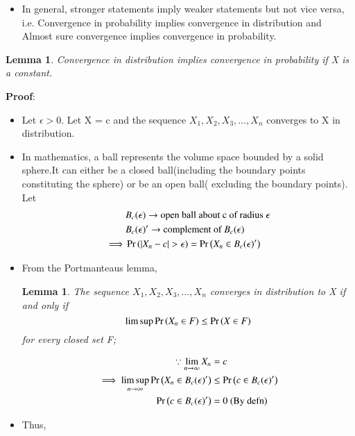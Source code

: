 \documentclass[journal,12pt,twocolumn]{IEEEtran}
\newtheorem{lemma}[theorem]{Lemma}
\begin{document}
\begin{itemize}
    \item In general, stronger statements imply weaker statements but not vice versa, i.e. Convergence in probability implies convergence in distribution and Almost sure convergence implies convergence in probability.
\end{itemize}
\begin{lemma} Convergence in distribution implies convergence in probability if X is a constant.\end{lemma}
    \textbf{Proof}:
    \begin{itemize}
        \item Let $\epsilon > 0$. Let X = c and the sequence $X_1,X_2,X_3, \dots ,X_n$ converges to X in distribution.
        \item In mathematics, a ball represents the volume space bounded by a solid sphere.It can either be a closed ball(including the boundary points constituting the sphere) or be an open ball( excluding the boundary points). Let \begin{align}
            &B_c( \epsilon ) \rightarrow \text{open ball about c of radius } \epsilon \\
            &B_c( \epsilon)^\prime \rightarrow \text{complement of } B_c( \epsilon ) \\
            \implies &\pr{|X_n - c|>\epsilon} = \pr{X_ n\in B_c( \epsilon )^\prime}
        \end{align}
        \item From the Portmanteaus lemma,\begin{lemma}
             The sequence $X_1,X_2,X_3, \dots ,X_n$ converges in distribution to X if and only if \begin{equation}
                  \limsup \Pr\left(X_{n}\in F\right) \leq \Pr\left(X \in F\right)
             \end{equation} for every closed set F;
        \end{lemma} 
        \begin{align}
           \because \lim_{n \rightarrow \infty}X_n &= c \\
            \implies \limsup_{n \rightarrow \infty} \Pr\left(X_n \in B_c( \epsilon )^\prime\right) &\leq  \Pr\left(c \in B_c( \epsilon )^\prime\right) \\
            \Pr\left(c \in B_c( \epsilon )^\prime\right) &= 0 \text{ (By defn)}
        \end{align}
        \item Thus,
        \begin{align}

\end{align}
\end{itemize}
\end{document}
